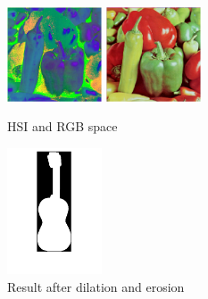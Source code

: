\documentclass[11pt,letterpaper]{article}
\begin{document}
\begin{figure}
	\centering
	\includegraphics[width=0.25\textwidth]{images/p3a/HSI.png}
	\includegraphics[width=0.25\textwidth]{images/p3a/RGB.png}
	\caption{HSI and RGB space}
	\label{fig:p3a}
	\includegraphics[width=0.25\textwidth]{images/p3b/guitar_res.png}
	\caption{Result after dilation and erosion}
	\label{fig:p3b}
\end{figure}
\end{document}
